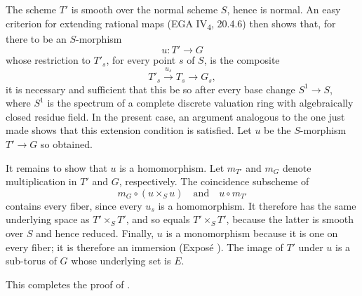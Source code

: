 The scheme \(T'\) is smooth over the normal scheme \(S\), hence is
normal. An easy criterion for extending rational maps (EGA
IV\textsubscript{4}, 20.4.6) then shows that, for there to be an
\(S\)-morphism
\[
  u:T'\longrightarrow G
\]
whose restriction to \(T'_s\), for every point \(s\) of \(S\), is the
composite
\[
  T'_s\xrightarrow{u_s}T_s\longrightarrow G_s,
\]
it is necessary and sufficient that this be so after every base
change \(S^1\to S\), where \(S^1\) is the spectrum of a complete
discrete valuation ring with algebraically closed residue field. In
the present case, an argument analogous to the one just made shows
that this extension condition is satisfied. Let \(u\) be the
\(S\)-morphism \(T'\to G\) so obtained.

It remains to show that \(u\) is a homomorphism. Let \(m_{T'}\)
and \(m_G\) denote multiplication in \(T'\) and \(G\),
respectively. The coincidence subscheme of
\[
  m_G\circ(u\times_Su)
  \quad\text{and}\quad
  u\circ m_{T'}
\]
contains every fiber, since every \(u_s\) is a homomorphism. It
therefore has the same underlying space as \(T'\times_S T'\), and
so equals \(T'\times_S T'\), because the latter is smooth over
\(S\) and hence reduced. Finally, \(u\) is a monomorphism because
it is one on every fiber; it is therefore an immersion (Exposé
). The image of \(T'\) under \(u\) is a sub-torus of \(G\)
whose underlying set is \(E\).

This completes the proof of .
